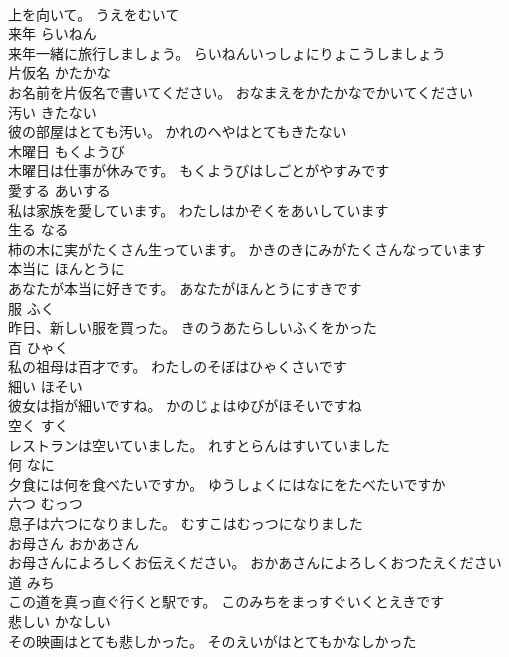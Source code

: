 \documentclass[8pt]{extreport}
\begin{document}
\begin{CJK}{UTF8}{min}
\\	上を向いて。	うえをむいて	
\\	来年	らいねん	
\\	来年一緒に旅行しましょう。	らいねんいっしょにりょこうしましょう	
\\	片仮名	かたかな	
\\	お名前を片仮名で書いてください。	おなまえをかたかなでかいてください	
\\	汚い	きたない	
\\	彼の部屋はとても汚い。	かれのへやはとてもきたない	
\\	木曜日	もくようび	
\\	木曜日は仕事が休みです。	もくようびはしごとがやすみです	
\\	愛する	あいする	
\\	私は家族を愛しています。	わたしはかぞくをあいしています	
\\	生る	なる	
\\	柿の木に実がたくさん生っています。	かきのきにみがたくさんなっています	
\\	本当に	ほんとうに	
\\	あなたが本当に好きです。	あなたがほんとうにすきです	
\\	服	ふく	
\\	昨日、新しい服を買った。	きのうあたらしいふくをかった	
\\	百	ひゃく	
\\	私の祖母は百才です。	わたしのそぼはひゃくさいです	
\\	細い	ほそい	
\\	彼女は指が細いですね。	かのじょはゆびがほそいですね	
\\	空く	すく	
\\	レストランは空いていました。	れすとらんはすいていました	
\\	何	なに	
\\	夕食には何を食べたいですか。	ゆうしょくにはなにをたべたいですか	
\\	六つ	むっつ	
\\	息子は六つになりました。	むすこはむっつになりました	
\\	お母さん	おかあさん	
\\	お母さんによろしくお伝えください。	おかあさんによろしくおつたえください	
\\	道	みち	
\\	この道を真っ直ぐ行くと駅です。	このみちをまっすぐいくとえきです	
\\	悲しい	かなしい	
\\	その映画はとても悲しかった。	そのえいがはとてもかなしかった	

\end{CJK}
\end{document}
